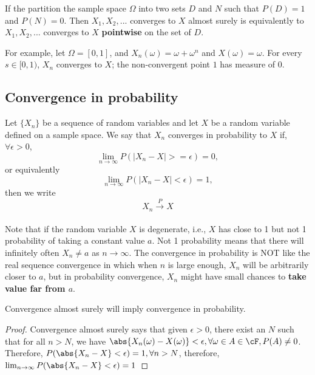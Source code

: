 \begin{refsection}
\begin{remark}
If the partition the sample space $\Omega$ into two sets $D$ and $N$ such that $P(D) = 1$ and $P(N) = 0$. Then $X_1,X_2,...$ converges to $X$ almost surely is equivalently to $X_1,X_2,...$ converges to $X$ \textbf{pointwise} on the set of $D$. 	
\end{remark}

\begin{example}
For example, let $\Omega = [0,1]$, and $X_n(\omega) = \omega + \omega^n$ and $X(\omega) = \omega$. For every $s\in [0,1)$, $X_n$ converges to $X$; the non-convergent point $1$ has measure of 0.
\end{example}


\subsection{Convergence in probability }
\begin{definition}
\cite{hoggintroduction}Let $\{X_n\}$ be a sequence of random variables and let $X$ be a random variable defined on a sample space. We say that $X_n$ converges in probability to $X$ if, $\forall \epsilon > 0 $, $$\lim_{n\rightarrow \infty} P(|X_n-X|>=\epsilon) = 0,$$ or equivalently $$\lim_{n\rightarrow \infty} P(|X_n-X|<\epsilon) = 1,$$
then we write $$X_n \xrightarrow[ ]{P} X $$
\end{definition}

\begin{remark}
Note that if the random variable $X$ is degenerate, i.e., $X$ has close to 1 but not 1 probability  of taking a constant value $a$. Not 1 probability means that there will infinitely often $X_n \neq a$ as $n \rightarrow \infty$. The convergence in probability is NOT like the real sequence convergence in which when $n$ is large enough, $X_n$ will be arbitrarily closer to $a$, but in probability convergence, $X_n$ might have small chances to \textbf{take value far from $a$}.
\end{remark}

\begin{lemma}
\cite{de2012understanding}\cite{casella2002statistical}Convergence almost surely will imply convergence in probability.
\end{lemma}
\begin{proof}
	Convergence almost surely says that given $\epsilon > 0$, there exist an $N$ such that for all $n > N$, we have $\abs{X_n(\omega) - X(\omega)} < \epsilon, \forall \omega \in A \in \cF,P(A) \neq 0$. Therefore, $P(\abs{X_n-X}<\epsilon) = 1,\forall n > N$, therefore, $\lim_{n\to \infty} P(\abs{X_n-X}<\epsilon) = 1$
\end{proof}



\end{refsection}
